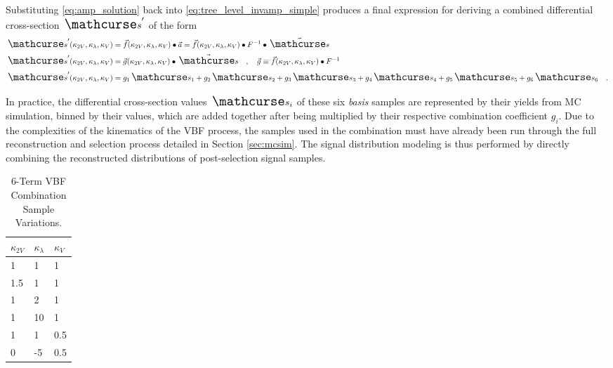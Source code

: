     \newcommand{\combterm}[1]{ g_{#1} \xsec_{#1} }

    Substituting \ref{eq:amp_solution} back into \ref{eq:tree_level_invamp_simple} produces
        a final expression for deriving a combined differential cross-section $\xsec'$ of the form
    \begin{equation} \label{eq:combination_general} \begin{split}
        \xsec'(\kvv,\kl,\kv) &= \vec{f}(\kvv,\kl,\kv) \bullet \vec{a}
            = \vec{f}(\kvv,\kl,\kv) \bullet F^{-1} \bullet \vec{\xsec} \\
        \xsec'(\kvv,\kl,\kv) &= \vec{g}(\kvv,\kl,\kv) \bullet \vec{\xsec}
            \quad,\quad \vec{g} \equiv \vec{f}(\kvv,\kl,\kv) \bullet F^{-1} \\
        \xsec'(\kvv,\kl,\kv) &= 
            \combterm{1} +
            \combterm{2} +
            \combterm{3} +
            \combterm{4} +
            \combterm{5} +
            \combterm{6}
        \quad.
    \end{split} \end{equation}

    In practice, the differential cross-section values $\xsec_i$ of these six \textit{basis} samples
        are represented by their yields from MC simulation,
        binned by their \mhh values,
        which are added together after being multiplied by their respective combination coefficient $g_i$.
    Due to the complexities of the kinematics of the VBF process,
        the samples used in the combination must have already been run through the full reconstruction and selection process detailed in Section \ref{sec:mcsim}.
    The signal distribution modeling is thus performed by directly combining the reconstructed \mhh distributions of post-selection signal samples.

    \begin{table}[] \centering
    \caption{6-Term VBF Combination Sample Variations.}
    \label{tab:vbf_hh_6term_varlist}
    \begin{tabular}{ |l|l|l| }
        \hline
        \textbf {$\kappa_{2V}$} & \textbf {$\kappa_\lambda$} & \textbf {$\kappa_V$} \\
        \hline
            1   &   1 & 1   \\
            1.5 &   1 & 1   \\
            1   &   2 & 1   \\
            1   &  10 & 1   \\
            1   &   1 & 0.5 \\
            0   &  -5 & 0.5 \\
        \hline
    \end{tabular} \end{table}

